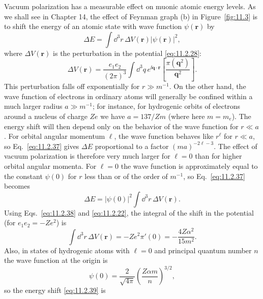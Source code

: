 Vacuum polarization has a measurable effect on muonic atomic energy
levels. As we shall see in Chapter 14, the effect of Feynman graph (b) in
Figure~\ref{fig:11.3} is to shift the energy of an atomic state with wave function
$\psi(\mathbf r)$ by
\begin{equation}
  \Delta E=\int \dd^3r\,\Delta V(\mathbf r)|\psi(\mathbf r)|^2,
  \tag{11.2.37}\label{eq:11.2.37}
\end{equation}
where $\Delta V(\mathbf r)$ is the perturbation in the potential \eqref{eq:11.2.28}:
\begin{equation}
  \Delta V(\mathbf r)=\frac{e_1e_2}{(2\pi)^3}\int \dd^3q\,
  e^{\ii\mathbf q\cdot\mathbf r}\left[\frac{\pi(\mathbf q^2)}{\mathbf q^2}\right].
  \tag{11.2.38}\label{eq:11.2.38}
\end{equation}
This perturbation falls off exponentially for $r\gg m^{-1}$. On the other
hand, the wave function of electrons in ordinary atoms will generally be
confined within a much larger radius $a\gg m^{-1}$; for instance, for
hydrogenic orbits of electrons around a nucleus of charge $Ze$ we have
$a=137/Zm$ (where here $m=m_e$). The energy shift will then depend only
on the behavior of the wave function for $r\ll a$. For orbital angular
momentum $\ell$, the wave function behaves like $r^\ell$ for $r\ll a$, so
Eq.~\eqref{eq:11.2.37} gives $\Delta E$ proportional to a factor $(ma)^{-2\ell-3}$.
The effect of vacuum polarization is therefore very much larger for $\ell=0$
than for higher orbital angular momenta. For $\ell=0$ the wave function is
approximately equal to the constant $\psi(0)$ for $r$ less than or of the
order of $m^{-1}$, so Eq.~\eqref{eq:11.2.37} becomes
\begin{equation}
  \Delta E=|\psi(0)|^2\int \dd^3r\,\Delta V(\mathbf r).
  \tag{11.2.39}\label{eq:11.2.39}
\end{equation}
Using Eqs.~\eqref{eq:11.2.38} and \eqref{eq:11.2.22}, the integral of the shift in the potential
(for $e_1e_2=-Ze^2$) is
\begin{equation}
  \int \dd^3r\,\Delta V(\mathbf r)=-Ze^2\pi'(0)
  =-\frac{4Z\alpha^2}{15m^2}.
  \tag{11.2.40}\label{eq:11.2.40}
\end{equation}
Also, in states of hydrogenic atoms with $\ell=0$ and principal quantum
number $n$ the wave function at the origin is
\begin{equation}
  \psi(0)=\frac2{\sqrt{4\pi}}\left(\frac{Z\alpha m}{n}\right)^{3/2},
  \tag{11.2.41}\label{eq:11.2.41}
\end{equation}
so the energy shift \eqref{eq:11.2.39} is
